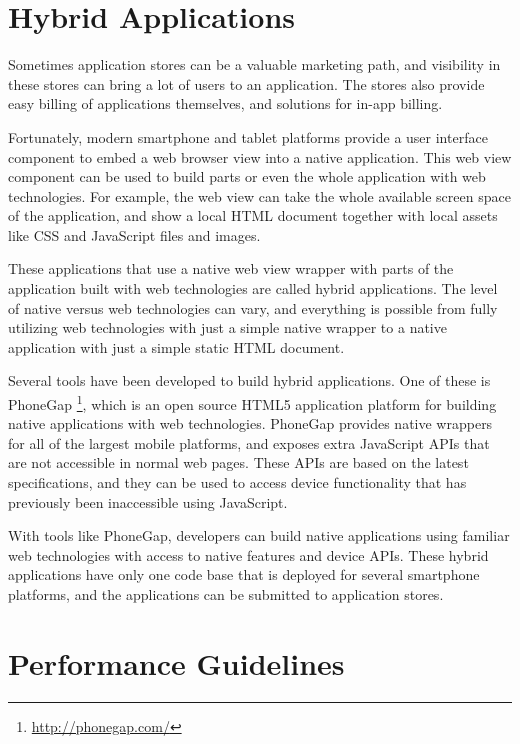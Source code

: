\section{Hybrid Applications}

Sometimes application stores can be a valuable marketing path, and
visibility in these stores can bring a lot of users to an
application. The stores also provide easy billing of applications
themselves, and solutions for in-app
billing. \cite{cortimiglia2011mobile}

Fortunately, modern smartphone and tablet platforms provide a user
interface component to embed a web browser view into a native
application. This web view component can be used to build parts or
even the whole application with web technologies. For example, the web
view can take the whole available screen space of the application, and
show a local HTML document together with local assets like CSS and
JavaScript files and images.

These applications that use a native web view wrapper with parts of
the application built with web technologies are called hybrid
applications. The level of native versus web technologies can vary,
and everything is possible from fully utilizing web technologies with
just a simple native wrapper to a native application with just a
simple static HTML document.

Several tools have been developed to build hybrid applications. One of
these is PhoneGap \footnote{\url{http://phonegap.com/}}, which is an
open source HTML5 application platform for building native
applications with web technologies. PhoneGap provides native wrappers
for all of the largest mobile platforms, and exposes extra JavaScript
APIs that are not accessible in normal web pages. These APIs are based
on the latest specifications, and they can be used to access device
functionality that has previously been inaccessible using JavaScript.

With tools like PhoneGap, developers can build native applications
using familiar web technologies with access to native features and
device APIs. These hybrid applications have only one code base that is
deployed for several smartphone platforms, and the applications can be
submitted to application stores.

\section{Performance Guidelines}
\label{section:performance-guidelines}

